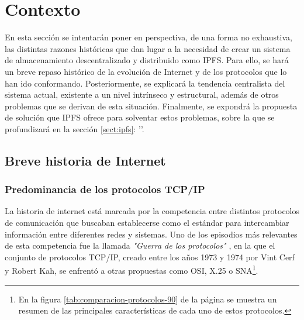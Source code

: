 \chapter{Contexto}\label{chap:2contexto}

En esta sección se intentarán poner en perspectiva, de una forma no exhaustiva, las distintas razones
históricas que dan lugar a la necesidad de crear un sistema de almacenamiento descentralizado y distribuido como IPFS.
Para ello, se hará un breve repaso histórico de la evolución de Internet y de los protocolos que lo han ido conformando.
Posteriormente, se explicará la tendencia centralista del sistema actual, existente a un nivel intrínseco y estructural,
además de otros problemas que se derivan de esta situación.
Finalmente, se expondrá la propuesta de solución que IPFS ofrece para solventar estos problemas, sobre la que se profundizará en la sección \ref{sect:ipfs}: ''.

\section{Breve historia de Internet}
\subsection{Predominancia de los protocolos TCP/IP}
La historia de internet está marcada por la competencia entre distintos protocolos de comunicación que buscaban establecerse
como el estándar para intercambiar información entre diferentes redes y sistemas. Uno de los episodios más relevantes de esta
competencia fue la llamada \textit{"Guerra de los protocolos"} \cite{ProtocolWars2023}, en la que el conjunto de protocolos TCP/IP, creado entre los
años 1973 y 1974 por Vint Cerf y Robert Kah, se enfrentó a otras propuestas como OSI, X.25 o SNA\footnote{En la figura \ref{tab:comparacion-protocolos-90} de la página \pageref{tab:comparacion-protocolos-90} se muestra un resumen de las principales características de cada uno de estos protocolos.
}.

